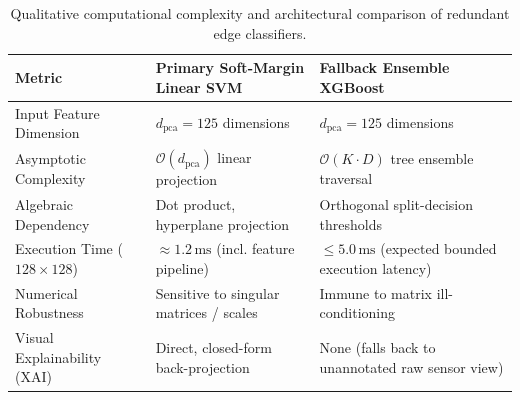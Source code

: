 \begin{table}[htbp]
\centering
\small
\setlength{\tabcolsep}{6pt}
\caption{Qualitative computational complexity and architectural comparison of redundant edge classifiers.}
\label{tab:edge_classifier_comparison}
\begin{tabularx}{\textwidth}{@{}l L L@{}}
\toprule
\textbf{Metric} & \textbf{Primary Soft-Margin Linear SVM} & \textbf{Fallback Ensemble XGBoost} \\ \midrule
Input Feature Dimension & $d_{\text{pca}} = 125$ dimensions & $d_{\text{pca}} = 125$ dimensions \\ \addlinespace
Asymptotic Complexity & $\mathcal{O}(d_{\text{pca}})$ linear projection & $\mathcal{O}(K \cdot D)$ tree ensemble traversal \\ \addlinespace
Algebraic Dependency & Dot product, hyperplane projection & Orthogonal split-decision thresholds \\ \addlinespace
Execution Time ($128 \times 128$) & $\approx 1.2\,\text{ms}$ (incl. feature pipeline) & $\le 5.0\,\text{ms}$ (expected bounded execution latency) \\ \addlinespace
Numerical Robustness & Sensitive to singular matrices / scales & Immune to matrix ill-conditioning \\ \addlinespace
Visual Explainability (XAI) & Direct, closed-form back-projection & None (falls back to unannotated raw sensor view) \\ \bottomrule
\end{tabularx}
\end{table}